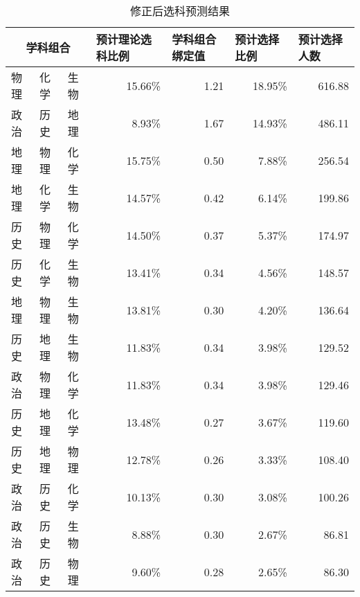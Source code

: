 \documentclass[bwprint]{cumcmthesis}
\begin{document}
	\begin{longtable}{cccrrrr}
		\caption{\label{tab:pre_result}修正后选科预测结果}\\
		\toprule
		\multicolumn{3}{c}{学科组合} & \multicolumn{1}{l}{预计理论选科比例} & \multicolumn{1}{l}{学科组合绑定值} & \multicolumn{1}{l}{预计选择比例} & \multicolumn{1}{l}{预计选择人数} \\
		\midrule
		\multicolumn{1}{l}{物理} & \multicolumn{1}{l}{化学} & \multicolumn{1}{l}{生物} & 15.66\% & 1.21  & 18.95\% & 616.88  \\
		\multicolumn{1}{l}{政治} & \multicolumn{1}{l}{历史} & \multicolumn{1}{l}{地理} & 8.93\% & 1.67  & 14.93\% & 486.11  \\
		\multicolumn{1}{l}{地理} & \multicolumn{1}{l}{物理} & \multicolumn{1}{l}{化学} & 15.75\% & 0.50  & 7.88\% & 256.54  \\
		\multicolumn{1}{l}{地理} & \multicolumn{1}{l}{化学} & \multicolumn{1}{l}{生物} & 14.57\% & 0.42  & 6.14\% & 199.86  \\
		\multicolumn{1}{l}{历史} & \multicolumn{1}{l}{物理} & \multicolumn{1}{l}{化学} & 14.50\% & 0.37  & 5.37\% & 174.97  \\
		\multicolumn{1}{l}{历史} & \multicolumn{1}{l}{化学} & \multicolumn{1}{l}{生物} & 13.41\% & 0.34  & 4.56\% & 148.57  \\
		\multicolumn{1}{l}{地理} & \multicolumn{1}{l}{物理} & \multicolumn{1}{l}{生物} & 13.81\% & 0.30  & 4.20\% & 136.64  \\
		\multicolumn{1}{l}{历史} & \multicolumn{1}{l}{地理} & \multicolumn{1}{l}{生物} & 11.83\% & 0.34  & 3.98\% & 129.52  \\
		\multicolumn{1}{l}{政治} & \multicolumn{1}{l}{物理} & \multicolumn{1}{l}{化学} & 11.83\% & 0.34  & 3.98\% & 129.46  \\
		\multicolumn{1}{l}{历史} & \multicolumn{1}{l}{地理} & \multicolumn{1}{l}{化学} & 13.48\% & 0.27  & 3.67\% & 119.60  \\
		\multicolumn{1}{l}{历史} & \multicolumn{1}{l}{地理} & \multicolumn{1}{l}{物理} & 12.78\% & 0.26  & 3.33\% & 108.40  \\
		\multicolumn{1}{l}{政治} & \multicolumn{1}{l}{历史} & \multicolumn{1}{l}{化学} & 10.13\% & 0.30  & 3.08\% & 100.26  \\
		\multicolumn{1}{l}{政治} & \multicolumn{1}{l}{历史} & \multicolumn{1}{l}{生物} & 8.88\% & 0.30  & 2.67\% & 86.81  \\
		\multicolumn{1}{l}{政治} & \multicolumn{1}{l}{历史} & \multicolumn{1}{l}{物理} & 9.60\% & 0.28  & 2.65\% & 86.30  \\

\end{longtable}
\end{document}

